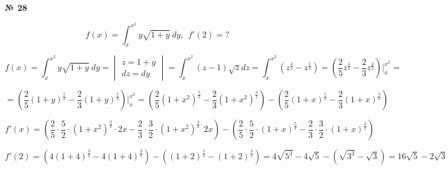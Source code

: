 \documentclass{article}
\begin{document}
\textbf{№ 28} 

$$ f(x) = \int_{x}^{x^2} y\sqrt{1+y} \ dy, \ \ f'(2) = ? $$ 

$$ f(x)
= \int_{x}^{x^2} y\sqrt{1+y} \ dy
= \begin{vmatrix} z = 1+y \\
                 dz = dy \end{vmatrix}
= \int_{x}^{x^2} (z-1) \sqrt{z} dz
= \int_{x}^{x^2} \left( z^{\frac{3}{2}} - z^{\frac{1}{2}} \right)
= \left( \frac{2}{5} z^{\frac{5}{2}} - \frac{2}{3} z^{\frac{3}{2}} \right) \bigg\vert_{x}^{x^2} 
= $$

$$ = \left( \frac{2}{5} (1+y)^{\frac{5}{2}} - \frac{2}{3} (1+y)^{\frac{3}{2}} \right) \bigg\vert_{x}^{x^2} 
= \left( \frac{2}{5} (1+x^2)^{\frac{5}{2}} - \frac{2}{3} (1+x^2)^{\frac{3}{2}} \right) - \left( \frac{2}{5} (1+x)^{\frac{5}{2}} - \frac{2}{3} (1+x)^{\frac{3}{2}} \right) $$

$$ f'(x) 
= \left( \frac{2}{5} \cdot \frac{5}{2} \cdot (1+x^2)^{\frac{3}{2}} \cdot 2x - \frac{2}{3} \cdot \frac{3}{2} \cdot (1+x^2)^{\frac{3}{2} \cdot }2x \right) - \left( \frac{2}{5} \cdot \frac{5}{2} \cdot (1+x)^{\frac{5}{2}} - \frac{2}{3} \cdot \frac{3}{2} \cdot (1+x)^{\frac{3}{2}} \right) $$

$$ f'(2)
= \left( 4(1+4)^{\frac{3}{2}} - 4(1+4)^{\frac{3}{2}} \right) - \left( (1+2)^{\frac{5}{2}} - (1+2)^{\frac{3}{2}} \right) 
= 4\sqrt{5^3} - 4\sqrt{5} - \left( \sqrt{3^3} - \sqrt{3} \right) 
= 16\sqrt{5} - 2\sqrt{3} $$
\end{document}
